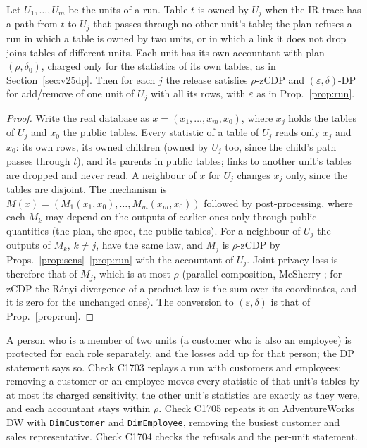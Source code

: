 \setcounter{proposition}{1702}
\begin{proposition}\label{prop:multiunit}
Let $U_1,\dots,U_m$ be the units of a run. Table $t$ is owned by $U_j$ when the IR trace has a path from $t$ to $U_j$ that passes through no other unit's table; the plan refuses a run in which a table is owned by two units, or in which a link it does not drop joins tables of different units. Each unit has its own accountant with plan $(\rho,\delta_0)$, charged only for the statistics of its own tables, as in Section~\ref{sec:v25dp}. Then for each $j$ the release satisfies $\rho$-zCDP and $(\varepsilon,\delta)$-DP for add/remove of one unit of $U_j$ with all its rows, with $\varepsilon$ as in Prop.~\ref{prop:run}.
\end{proposition}
\begin{proof}
Write the real database as $x=(x_1,\dots,x_m,x_0)$, where $x_j$ holds the tables of $U_j$ and $x_0$ the public tables. Every statistic of a table of $U_j$ reads only $x_j$ and $x_0$: its own rows, its owned children (owned by $U_j$ too, since the child's path passes through $t$), and its parents in public tables; links to another unit's tables are dropped and never read. A neighbour of $x$ for $U_j$ changes $x_j$ only, since the tables are disjoint. The mechanism is $M(x)=(M_1(x_1,x_0),\dots,M_m(x_m,x_0))$ followed by post-processing, where each $M_k$ may depend on the outputs of earlier ones only through public quantities (the plan, the spec, the public tables). For a neighbour of $U_j$ the outputs of $M_k$, $k\neq j$, have the same law, and $M_j$ is $\rho$-zCDP by Props.~\ref{prop:sens}--\ref{prop:run} with the accountant of $U_j$. Joint privacy loss is therefore that of $M_j$, which is at most $\rho$ (parallel composition, McSherry \cite{mcsherry2009}; for zCDP the R\'enyi divergence of a product law is the sum over its coordinates, and it is zero for the unchanged ones). The conversion to $(\varepsilon,\delta)$ is that of Prop.~\ref{prop:run}.
\end{proof}
\noindent A person who is a member of two units (a customer who is also an employee) is protected for each role separately, and the losses add up for that person; the DP statement says so. Check C1703 replays a run with customers and employees: removing a customer or an employee moves every statistic of that unit's tables by at most its charged sensitivity, the other unit's statistics are exactly as they were, and each accountant stays within $\rho$. Check C1705 repeats it on AdventureWorks DW with \texttt{DimCustomer} and \texttt{DimEmployee}, removing the busiest customer and sales representative. Check C1704 checks the refusals and the per-unit statement.

